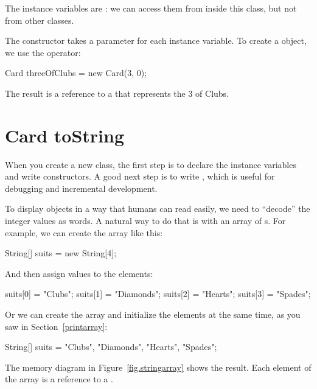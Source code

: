 
The instance variables are : we can access them from inside this class, but not from other classes.

The constructor takes a parameter for each instance variable.
To create a  object, we use the  operator:

\begin{code}
Card threeOfClubs = new Card(3, 0);
\end{code}

The result is a reference to a  that represents the 3 of Clubs.


\section{Card toString}

When you create a new class, the first step is to declare the instance variables and write constructors.
A good next step is to write , which is useful for debugging and incremental development.


To display  objects in a way that humans can read easily, we need to ``decode'' the integer values as words.
A natural way to do that is with an array of s.
For example, we can create the array like this:

\begin{code}
String[] suits = new String[4];
\end{code}

And then assign values to the elements:

\begin{code}
suits[0] = "Clubs";
suits[1] = "Diamonds";
suits[2] = "Hearts";
suits[3] = "Spades";
\end{code}

Or we can create the array and initialize the elements at the same time, as you saw in Section~\ref{printarray}:

\begin{code}
String[] suits = {"Clubs", "Diamonds", "Hearts", "Spades"};
\end{code}


The memory diagram in Figure~\ref{fig.stringarray} shows the result.
Each element of the array is a reference to a .

